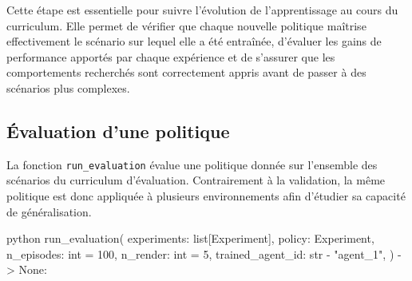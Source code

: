 \noindent Cette étape est essentielle pour suivre l'évolution de l'apprentissage au cours du curriculum. Elle permet de vérifier que chaque nouvelle politique maîtrise effectivement le scénario sur lequel elle a été entraînée, d'évaluer les gains de performance apportés par chaque expérience et de s'assurer que les comportements recherchés sont correctement appris avant de passer à des scénarios plus complexes.

\subsection{Évaluation d'une politique}
\label{subsec:run_evaluation}

\noindent La fonction \texttt{run\_evaluation} évalue une politique donnée sur l'ensemble des scénarios du curriculum d'évaluation. Contrairement à la validation, la même politique est donc appliquée à plusieurs environnements afin d'étudier sa capacité de généralisation.

\begin{codebox}{python}
run_evaluation(
    experiments: list[Experiment],
    policy: Experiment,
    n_episodes: int = 100,
    n_render: int = 5,
    trained_agent_id: str - "agent_1",
) -> None:
\end{codebox}

